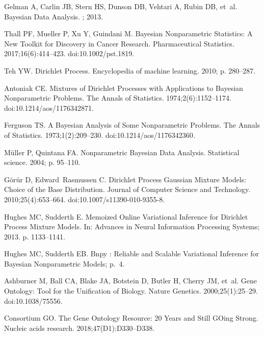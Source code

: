 \documentclass[10pt,letterpaper]{article}
\begin{document}
\begin{thebibliography}{10}
Gelman A, Carlin JB, Stern HS, Dunson DB, Vehtari A, Rubin DB, et~al.
\newblock Bayesian {{Data Analysis}}.
; 2013.

Thall PF, Mueller P, Xu Y, Guindani M.
\newblock Bayesian Nonparametric Statistics: {{A}} New Toolkit for Discovery in
Cancer Research.
\newblock Pharmaceutical Statistics. 2017;16(6):414--423.
\newblock doi:{10.1002/pst.1819}.

Teh YW.
\newblock Dirichlet Process.
\newblock Encyclopedia of machine learning. 2010; p. 280--287.

Antoniak CE.
\newblock Mixtures of {{Dirichlet Processes}} with {{Applications}} to
{{Bayesian Nonparametric Problems}}.
\newblock The Annals of Statistics. 1974;2(6):1152--1174.
\newblock doi:{10.1214/aos/1176342871}.

Ferguson TS.
\newblock A {{Bayesian Analysis}} of {{Some Nonparametric Problems}}.
\newblock The Annals of Statistics. 1973;1(2):209--230.
\newblock doi:{10.1214/aos/1176342360}.

M{\"u}ller P, Quintana FA.
\newblock Nonparametric Bayesian Data Analysis.
\newblock Statistical science. 2004; p. 95--110.

G{\"o}r{\"u}r D, Edward~Rasmussen C.
\newblock Dirichlet {{Process Gaussian Mixture Models}}: {{Choice}} of the
{{Base Distribution}}.
\newblock Journal of Computer Science and Technology. 2010;25(4):653--664.
\newblock doi:{10.1007/s11390-010-9355-8}.

Hughes MC, Sudderth E.
\newblock Memoized Online Variational Inference for {{Dirichlet}} Process
Mixture Models.
\newblock In: Advances in Neural Information Processing Systems; 2013. p.
1133--1141.

Hughes MC, Sudderth EB.
\newblock Bnpy : {{Reliable}} and Scalable Variational Inference for
{{Bayesian}} Nonparametric Models; p.~4.

Ashburner M, Ball CA, Blake JA, Botstein D, Butler H, Cherry JM, et~al.
\newblock Gene {{Ontology}}: Tool for the Unification of Biology.
\newblock Nature Genetics. 2000;25(1):25--29.
\newblock doi:{10.1038/75556}.

Consortium GO.
\newblock The Gene Ontology Resource: 20 Years and Still {{GOing}} Strong.
\newblock Nucleic acids research. 2018;47(D1):D330--D338.


\end{thebibliography}
\end{document}
